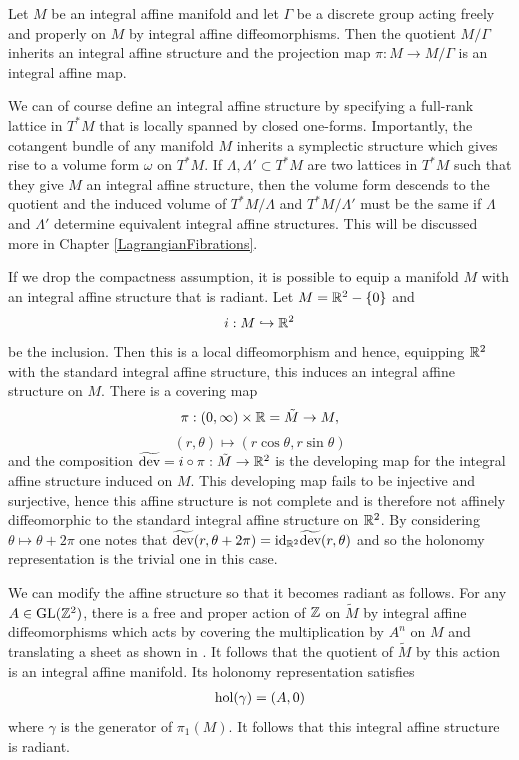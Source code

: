 \begin{eg}
    Let $M$ be an integral affine manifold and let $\Gamma$ be a discrete group acting freely and properly on $M$ by integral affine diffeomorphisms. Then the quotient
    $M/\Gamma$ inherits an integral affine structure and the projection map $\pi: M \to M/\Gamma$ is an integral affine map.
\end{eg}

We can of course define an integral affine structure by specifying a full-rank
lattice in $T^*M$ that is locally spanned by closed one-forms. Importantly, the
cotangent bundle of any manifold $M$ inherits a symplectic structure which
gives rise to a volume form $\omega$ on $T^*M$. If $\Lambda, \Lambda' \subset
    T^*M$ are two lattices in $T^*M$ such that they give $M$ an integral affine
structure, then the volume form descends to the quotient and the induced volume
of $T^*M/\Lambda$ and $T^*M/\Lambda'$ must be the same if $\Lambda$ and
$\Lambda'$ determine equivalent integral affine structures. This will be
discussed more in Chapter \ref{LagrangianFibrations}.

\begin{eg}
    If we drop the compactness assumption, it is possible to equip a manifold $M$ with an integral affine structure that is radiant.
    Let $M= \mathbb{R}^2 - \{0\}$ and
    $$
        i :  M \hookrightarrow \mathbb{R}^2
    $$
    be the inclusion. Then this is a local diffeomorphism and hence, equipping $\mathbb{R}^2$ with the standard integral affine structure, this induces an integral affine structure on $M$.
    There is a covering map
    $$
        \pi: (0, \infty) \times \mathbb{R} = \tilde{M} \to M,
    $$
    $$ (r, \theta) \mapsto (r \cos \theta, r \sin \theta)$$
    and the composition $\widetilde{\text{dev}} = i \circ \pi : \tilde{M}  \to \mathbb{R}^2$ is the developing map for the integral affine structure induced on $M$. This developing map fails to be injective and surjective,
    hence this affine structure is not complete and is therefore not affinely diffeomorphic to the standard integral affine structure on $\mathbb{R}^2$. By considering $\theta \mapsto \theta + 2\pi$ one
    notes that $\widetilde{\text{dev}}(r, \theta + 2\pi) = \text{id}_{\mathbb{R}^2} \widetilde{\text{dev}}(r, \theta)$
    and so the holonomy representation is the trivial one in this case.

    We can modify the affine structure so that it becomes radiant as follows. For
    any $A\in \text{GL}(\mathbb{Z}^2)$, there is a free and proper action of $\mathbb{Z}$ on
    $\tilde{M}$ by integral affine diffeomorphisms which acts by covering the
    multiplication by $A^n$ on $M$ and translating a sheet as shown in
    \cite{Bates2007}. It follows that the quotient of $\tilde{M}$ by this action is
    an integral affine manifold. Its holonomy representation satisfies
    \begin{align*}
        \text{hol} (\gamma) = (A, 0)
    \end{align*}
    where $\gamma$ is the generator of $\pi_1(M)$. It follows that this integral affine structure is radiant.
\end{eg}

